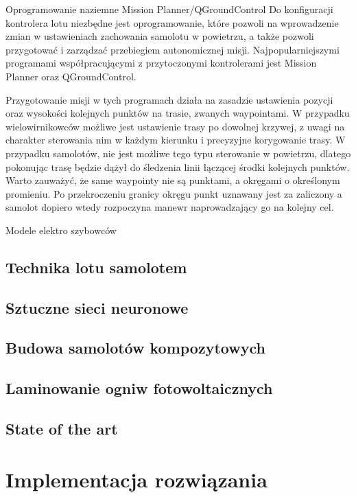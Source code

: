 \documentclass[12pt, a4paper]{article}
\begin{document}
Oprogramowanie naziemne
Mission Planner/QGroundControl
Do konfiguracji kontrolera lotu niezbędne jest oprogramowanie, które pozwoli na wprowadzenie zmian w ustawieniach zachowania samolotu w powietrzu, a także pozwoli przygotować i zarządzać przebiegiem autonomicznej misji. Najpopularniejszymi programami współpracującymi z przytoczonymi kontrolerami jest Mission Planner oraz QGroundControl.

Przygotowanie misji w tych programach działa na zasadzie ustawienia pozycji oraz wysokości kolejnych punktów na trasie, zwanych waypointami. W przypadku wielowirnikowców możliwe jest ustawienie trasy po dowolnej krzywej, z uwagi na charakter sterowania nim w każdym kierunku i precyzyjne korygowanie trasy. W przypadku samolotów, nie jest możliwe tego typu sterowanie w powietrzu, dlatego pokonując trasę będzie dążył do śledzenia linii łączącej środki kolejnych punktów. Warto zauważyć, że same waypointy nie są punktami, a okręgami o określonym promieniu. Po przekroczeniu granicy okręgu punkt uznawany jest za zaliczony a samolot dopiero wtedy rozpoczyna manewr naprowadzający go na kolejny cel.

Modele elektro szybowców

\subsection{Technika lotu samolotem}
\subsection{Sztuczne sieci neuronowe}
\subsection{Budowa samolotów kompozytowych}
\subsection{Laminowanie ogniw fotowoltaicznych}
\subsection{State of the art}
\newpage
\section{Implementacja rozwiązania}
\end{document}
